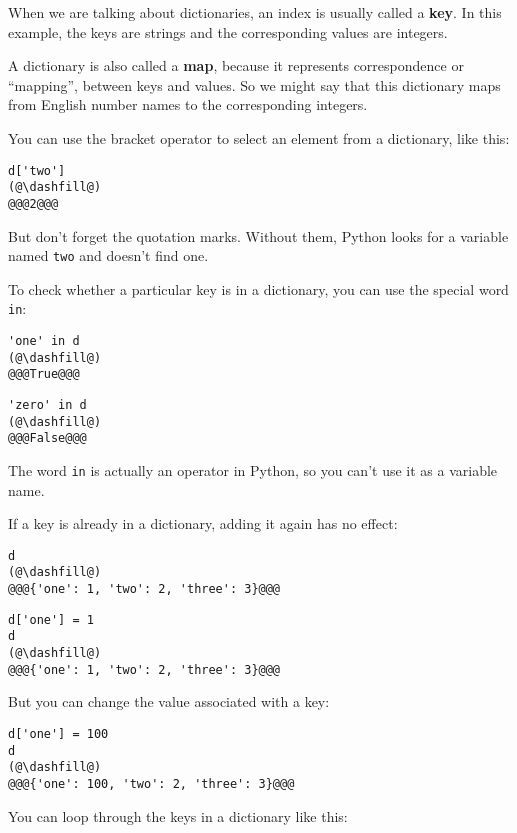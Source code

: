 When we are talking about dictionaries, an index is usually called a
\textbf{key}. In this example, the keys are strings and the
corresponding values are integers.

A dictionary is also called a \textbf{map}, because it represents
correspondence or ``mapping'', between keys and values. So we might say
that this dictionary maps from English number names to the corresponding
integers.

You can use the bracket operator to select an element from a dictionary,
like this:

\begin{lstlisting}[]
d['two']
(@\dashfill@)
@@@2@@@
\end{lstlisting}

But don't forget the quotation marks. Without them, Python looks for a
variable named \passthrough{\lstinline!two!} and doesn't find one.

To check whether a particular key is in a dictionary, you can use the
special word \passthrough{\lstinline!in!}:

\begin{lstlisting}[]
'one' in d
(@\dashfill@)
@@@True@@@
\end{lstlisting}

\begin{lstlisting}[]
'zero' in d
(@\dashfill@)
@@@False@@@
\end{lstlisting}

The word \passthrough{\lstinline!in!} is actually an operator in Python,
so you can't use it as a variable name.

If a key is already in a dictionary, adding it again has no effect:

\begin{lstlisting}[]
d
(@\dashfill@)
@@@{'one': 1, 'two': 2, 'three': 3}@@@
\end{lstlisting}

\begin{lstlisting}[]
d['one'] = 1
d
(@\dashfill@)
@@@{'one': 1, 'two': 2, 'three': 3}@@@
\end{lstlisting}

But you can change the value associated with a key:

\begin{lstlisting}[]
d['one'] = 100
d
(@\dashfill@)
@@@{'one': 100, 'two': 2, 'three': 3}@@@
\end{lstlisting}

You can loop through the keys in a dictionary like this:

